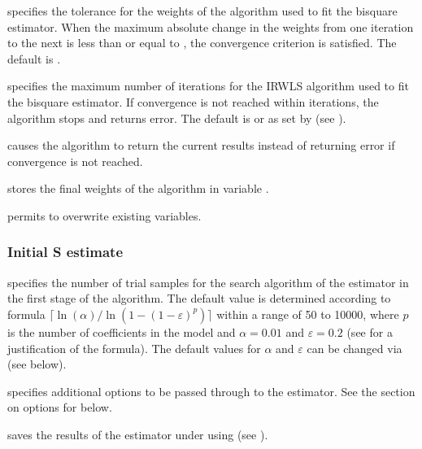 \hangpara
     specifies the tolerance for the weights of the
     algorithm used to fit the bisquare  estimator. When
    the maximum absolute change in the weights from one iteration to the next
    is less than or equal to , the convergence criterion is
    satisfied. The default is .

\hangpara
     specifies the maximum number of iterations for the
    IRWLS algorithm used to fit the bisquare  estimator. If convergence
    is not reached within  iterations, the algorithm stops and
    returns error. The default is  or as set by
     (see ).

\hangpara
     causes the  algorithm to return the current
    results instead of returning error if convergence is not reached.

\hangpara
     stores the final weights of the
     algorithm in variable .

\hangpara
     permits  to overwrite existing variables.

\subsubsection{Initial S estimate}

\hangpara
     specifies the number of trial samples for the search
    algorithm of the  estimator in the first stage of the 
    algorithm. The default value is determined according to formula
    $
    \lceil \ln(\alpha) / \ln(1 - (1 - \varepsilon)^p) \rceil
    $
    within a range of 50 to 10000, where $p$ is the number of coefficients in
    the model and $\alpha = 0.01$ and $\varepsilon = 0.2$ (see
    \citealp{salibian:yohai:2006} for a justification of the formula). The
    default values for $\alpha$ and $\varepsilon$ can be changed via
     (see below).

\hangpara
     specifies additional options to be passed
    through to the  estimator. See the section on options for
     below.

\hangpara
     saves the results of the  estimator under
     using  (see ).

